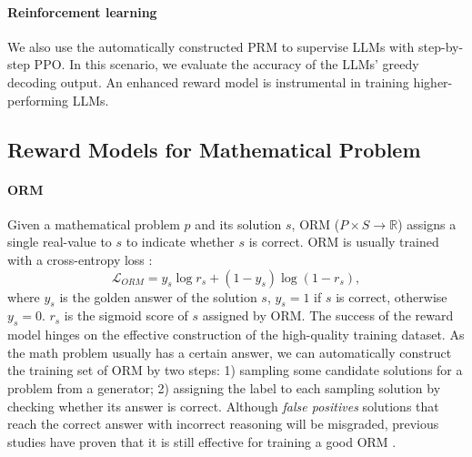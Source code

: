 \documentclass{article} %
\begin{document}
\paragraph{Reinforcement learning} We also use the automatically constructed PRM to supervise LLMs with step-by-step PPO. In this scenario, we evaluate the accuracy of the LLMs' greedy decoding output. 
An enhanced reward model is instrumental in training higher-performing LLMs.

\subsection{Reward Models for Mathematical Problem}
\label{subsec:reward_model}
\paragraph{ORM} Given a mathematical problem $p$ and its solution $s$, ORM ($P \times S \to \mathbb{R}$) assigns a single real-value to $s$ to indicate whether $s$ is correct.
ORM is usually trained with a cross-entropy loss \citep{cobbe2021training, li-etal-2023-making}:
\begin{equation}
    \mathcal{L}_{ORM} = y_s \log r_s + (1 - y_s) \log (1 - r_s),
\end{equation}
where $y_s$ is the golden answer of the solution $s$, $y_s=1$ if $s$ is correct, otherwise $y_s=0$. $r_s$ is the sigmoid score of $s$ assigned by ORM. 
The success of the reward model hinges on the effective construction of the high-quality training dataset. As the math problem usually has a certain answer, we can automatically construct the training set of ORM by two steps: 1) sampling some candidate solutions for a problem from a generator; 2) assigning the label to each sampling solution by checking whether its answer is correct. 
Although \textit{false positives} solutions that reach the correct answer with incorrect reasoning will be misgraded, previous studies have proven that it is still effective for training a good ORM \citep{lightman2023let,ovm}.
\end{document}
